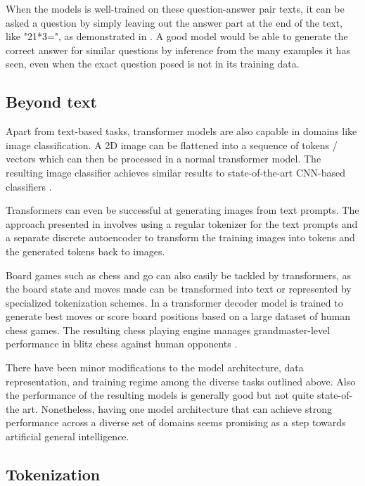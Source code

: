 When the models is well-trained on these question-answer pair texts, it can be asked a question by simply leaving out the answer part at the end of the text, like "21*3=", as demonstrated in \cite{alammar-transformer}. A good model would be able to generate the correct answer for similar questions by inference from the many examples it has seen, even when the exact question posed is not in its training data.

\subsection{Beyond text}

Apart from text-based tasks, transformer models are also capable in domains like image classification.
A 2D image can be flattened into a sequence of tokens / vectors which can then be processed in a normal transformer model. The resulting image classifier achieves similar results to state-of-the-art CNN-based classifiers .

Transformers can even be successful at generating images from text prompts. The approach presented in \cite{cogview} involves using a regular tokenizer for the text prompts and a separate discrete autoencoder to transform the training images into tokens and the generated tokens back to images.

Board games such as chess and go can also easily be tackled by transformers, as the board state and moves made can be transformed into text or represented by specialized tokenization schemes.
In \cite{grandmasterlevelchess} a transformer decoder model is trained to generate best moves or score board positions based on a large dataset of human chess games. The resulting chess playing engine manages grandmaster-level performance in blitz chess against human opponents .

There have been minor modifications to the model architecture, data representation, and training regime among the diverse tasks outlined above. Also the performance of the resulting models is generally good but not quite state-of-the art. Nonetheless, having one model architecture that can achieve strong performance across a diverse set of domains seems promising as a step towards artificial general intelligence.


\subsection{Tokenization}

